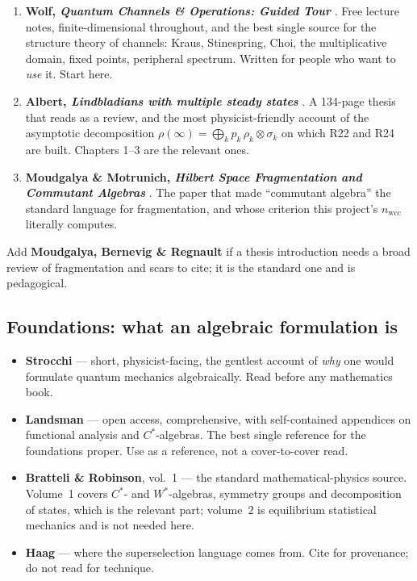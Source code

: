 \documentclass[11pt]{article}
\theoremstyle{plain}
\theoremstyle{remark}
\begin{document}
\begin{enumerate}[label=\textbf{\arabic*.}]
\item \textbf{Wolf, \emph{Quantum Channels \& Operations: Guided Tour}}
\cite{Wolf2012}. Free lecture notes, finite-dimensional throughout, and the
best single source for the structure theory of channels: Kraus, Stinespring,
Choi, the multiplicative domain, fixed points, peripheral spectrum. Written for
people who want to \emph{use} it. Start here.

\item \textbf{Albert, \emph{Lindbladians with multiple steady states}}
\cite{Albert2018}. A 134-page thesis that reads as a review, and the most
physicist-friendly account of the asymptotic decomposition
$\rho(\infty) = \bigoplus_k p_k\, \rho_k \otimes \sigma_k$ on which R22 and R24
are built. Chapters 1--3 are the relevant ones.

\item \textbf{Moudgalya \& Motrunich, \emph{Hilbert Space Fragmentation and
Commutant Algebras}} \cite{MM2022}. The paper that made ``commutant algebra''
the standard language for fragmentation, and whose criterion this project's
$n_{\mathrm{wcc}}$ literally computes.
\end{enumerate}

\noindent Add \textbf{Moudgalya, Bernevig \& Regnault} \cite{MBR2022} if a
thesis introduction needs a broad review of fragmentation and scars to cite; it
is the standard one and is pedagogical.

\subsection{Foundations: what an algebraic formulation is}

\begin{itemize}
\item \textbf{Strocchi} \cite{Strocchi2008} --- short, physicist-facing, the
gentlest account of \emph{why} one would formulate quantum mechanics
algebraically. Read before any mathematics book.
\item \textbf{Landsman} \cite{Landsman2017} --- open access, comprehensive,
with self-contained appendices on functional analysis and $C^*$-algebras. The
best single reference for the foundations proper. Use as a reference, not a
cover-to-cover read.
\item \textbf{Bratteli \& Robinson}, vol.~1 \cite{BR1} --- the standard
mathematical-physics source. Volume~1 covers $C^*$- and $W^*$-algebras,
symmetry groups and decomposition of states, which is the relevant part;
volume~2 is equilibrium statistical mechanics and is not needed here.
\item \textbf{Haag} \cite{Haag1996} --- where the superselection language comes
from. Cite for provenance; do not read for technique.
\end{itemize}
\end{document}
